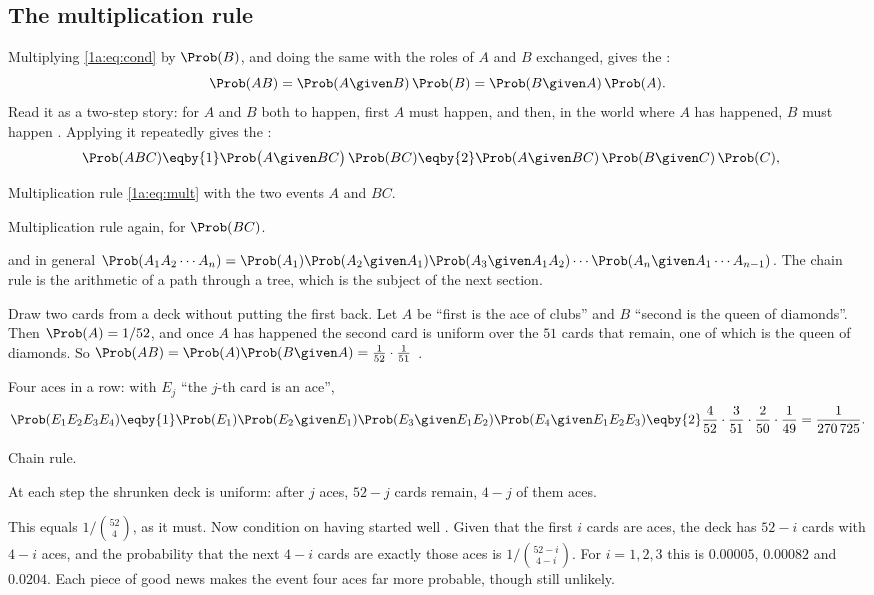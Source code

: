 \subsection{The multiplication rule}

Multiplying \eqref{1a:eq:cond} by $\Prob(B)$, and doing the same with the roles of
$A$ and $B$ exchanged, gives the 
:
\begin{equation}
\Prob(AB)=\Prob(A\given B)\,\Prob(B)=\Prob(B\given A)\,\Prob(A).
\label{1a:eq:mult}
\end{equation}
Read it as a two-step story: for $A$ and $B$ both to happen, first $A$ must
happen, and then, in the world where $A$ has happened, $B$ must happen
. Applying it repeatedly gives the 
:
\begin{align}
\Prob(ABC)
&\eqby{1}\Prob\bigl(A\given BC\bigr)\,\Prob(BC)
 \eqby{2}\Prob(A\given BC)\,\Prob(B\given C)\,\Prob(C),
\label{1a:eq:chain}
\end{align}
\begin{explain}
  \item Multiplication rule \eqref{1a:eq:mult} with the two events $A$ and $BC$.
  \item Multiplication rule again, for $\Prob(BC)$.
\end{explain}
and in general $\Prob(A_1A_2\cdots A_n)=\Prob(A_1)\Prob(A_2\given A_1)\Prob(A_3\given A_1A_2)\cdots
\Prob(A_n\given A_1\cdots A_{n-1})$. The chain rule is the arithmetic of a path through a
tree, which is the subject of the next section.

\label{1a:ex:cards}
Draw two cards from a deck without putting the first back. Let $A$ be ``first is
the ace of clubs'' and $B$ ``second is the queen of diamonds''. Then
$\Prob(A)=1/52$, and once $A$ has happened the second card is uniform over the $51$
cards that remain, one of which is the queen of diamonds. So
$\Prob(AB)=\Prob(A)\Prob(B\given A)=\tfrac1{52}\cdot\tfrac1{51}$ .

Four aces in a row: with $E_j$ ``the $j$-th card is an ace'',
\begin{align*}
\Prob(E_1E_2E_3E_4)
\eqby{1}\Prob(E_1)\Prob(E_2\given E_1)\Prob(E_3\given E_1E_2)\Prob(E_4\given E_1E_2E_3)
\eqby{2}\frac4{52}\cdot\frac3{51}\cdot\frac2{50}\cdot\frac1{49}
=\frac{1}{270\,725}.
\end{align*}
\begin{explain}
  \item Chain rule.
  \item At each step the shrunken deck is uniform: after $j$ aces, $52-j$ cards
        remain, $4-j$ of them aces.
\end{explain}
This equals $1/\binom{52}4$, as it must. Now condition on having started well
. Given that the first $i$ cards are aces, the
deck has $52-i$ cards with $4-i$ aces, and the probability that the next $4-i$
cards are exactly those aces is $1/\binom{52-i}{4-i}$. For $i=1,2,3$ this is
$0.00005$, $0.00082$ and $0.0204$. Each piece of good news makes the event four
aces far more probable, though still unlikely.

